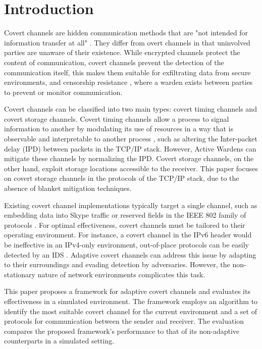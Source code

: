 \chapter{Introduction}
\label{ch:introduction}

Covert channels are hidden communication methods that are "not intended for information transfer at all" \cite{ANOTCP}. They differ from overt channels in that uninvolved parties are unaware of their existence. While encrypted channels protect the content of communication, covert channels prevent the detection of the communication itself, this makes them suitable for exfiltrating data from secure environments, and censorship resistance \cite{TWACCS}, where a warden exists between parties to prevent or monitor communication.

Covert channels can be classified into two main types: covert timing channels and covert storage channels. Covert timing channels allow a process to signal information to another by modulating its use of resources in a way that is observable and interpretable to another process \cite{TCSEC}, such as altering the Inter-packet delay (IPD) between packets in the TCP/IP stack. However, Active Wardens \cite{DIAWAPSCC} can mitigate these channels by normalizing the IPD. Covert storage channels, on the other hand, exploit storage locations accessible to the receiver. This paper focuses on covert storage channels in the protocols of the TCP/IP stack, due to the absence of blanket mitigation techniques.

Existing covert channel implementations typically target a single channel, such as embedding data into Skype traffic \cite{DAMBCTCST} or reserved fields in the IEEE 802 family of protocols \cite{CCiLANP}. For optimal effectiveness, covert channels must be tailored to their operating environment. For instance, a covert channel in the IPv6 header would be ineffective in an IPv4-only environment, out-of-place protocols can be easily detected by an IDS \cite{TWACCS}. Adaptive covert channels can address this issue by adapting to their surroundings and evading detection by adversaries. However, the non-stationary nature of network environments \cite{PNFD} complicates this task.

This paper proposes a framework for adaptive covert channels and evaluates its effectiveness in a simulated environment. The framework employs an algorithm to identify the most suitable covert channel for the current environment and a set of protocols for communication between the sender and receiver. The evaluation compares the proposed framework's performance to that of its non-adaptive counterparts in a simulated setting.
